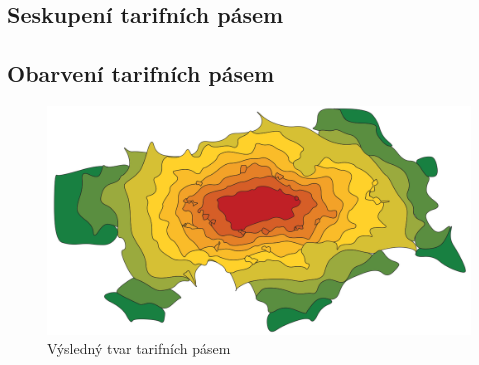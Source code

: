 \subsection{Seskupení tarifních pásem}

\subsection{Obarvení tarifních pásem}

\begin{figure}[H] \centering
    \includegraphics[width=400pt]{./pictures/vysledek.png}
    \caption[Výsledný tvar tarifních pásem]{Výsledný tvar tarifních pásem}
	\label{fig:vysledek}              
\end{figure}